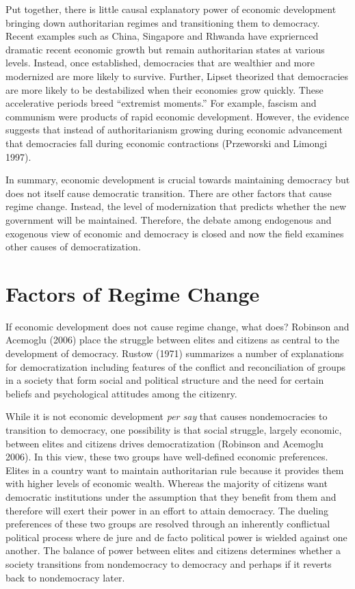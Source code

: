 \documentclass[12pt,]{article}
\begin{document}
Put together, there is little causal explanatory power of economic
development bringing down authoritarian regimes and transitioning them
to democracy. Recent examples such as China, Singapore and Rhwanda have
expriernced dramatic recent economic growth but remain authoritarian
states at various levels. Instead, once established, democracies that
are wealthier and more modernized are more likely to survive. Further,
Lipset theorized that democracies are more likely to be destabilized
when their economies grow quickly. These accelerative periods breed
``extremist moments.'' For example, fascism and communism were products
of rapid economic development. However, the evidence suggests that
instead of authoritarianism growing during economic advancement that
democracies fall during economic contractions (Przeworski and Limongi
1997).

In summary, economic development is crucial towards maintaining
democracy but does not itself cause democratic transition. There are
other factors that cause regime change. Instead, the level of
modernization that predicts whether the new government will be
maintained. Therefore, the debate among endogenous and exogenous view of
economic and democracy is closed and now the field examines other causes
of democratization.

\hypertarget{factors-of-regime-change}{%
\section{Factors of Regime Change}\label{factors-of-regime-change}}

If economic development does not cause regime change, what does?
Robinson and Acemoglu (2006) place the struggle between elites and
citizens as central to the development of democracy. Rustow (1971)
summarizes a number of explanations for democratization including
features of the conflict and reconciliation of groups in a society that
form social and political structure and the need for certain beliefs and
psychological attitudes among the citizenry.

While it is not economic development \emph{per say} that causes
nondemocracies to transition to democracy, one possibility is that
social struggle, largely economic, between elites and citizens drives
democratization (Robinson and Acemoglu 2006). In this view, these two
groups have well-defined economic preferences. Elites in a country want
to maintain authoritarian rule because it provides them with higher
levels of economic wealth. Whereas the majority of citizens want
democratic institutions under the assumption that they benefit from them
and therefore will exert their power in an effort to attain democracy.
The dueling preferences of these two groups are resolved through an
inherently conflictual political process where de jure and de facto
political power is wielded against one another. The balance of power
between elites and citizens determines whether a society transitions
from nondemocracy to democracy and perhaps if it reverts back to
nondemocracy later.
\end{document}

